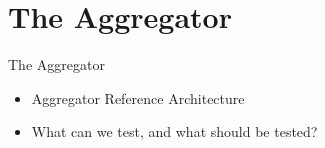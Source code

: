 \chapter{The Aggregator} %
\label{cha:aggregator}

The Aggregator
\begin{itemize}
	\item Aggregator Reference Architecture
	\item What can we test, and what should be tested?
\end{itemize}

